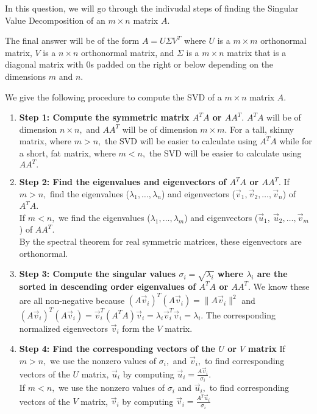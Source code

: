 

In this question, we will go through the indivudal steps of finding the Singular Value Decomposition of an $m \times n$ matrix $A.$

The final answer will be of the form $A = U \Sigma V^{T}$ where $U$ is a $m \times m$ orthonormal matrix, $V$ is a $n \times n$ orthonormal matrix, and $\Sigma$ is a $m \times n$ matrix that is a diagonal matrix with $0$s padded on the right or below depending on the dimensions $m$ and $n.$

We give the following procedure to compute the SVD of a $m \times n$ matrix $A.$

\begin{enumerate}[label=(\roman*)]
  \item \textbf{Step 1: Compute the symmetric matrix $A^{T} A$ or $A A^{T}.$} \vskip 1pt
  $A^{T}A$ will be of dimension $n \times n,$ and $AA^{T}$ will be of dimension $m \times m.$ \vskip 1pt
  For a tall, skinny matrix, where $m > n,$ the SVD will be easier to calculate using $A^{T}A$ while for a short, fat matrix, where $m < n,$ the SVD will be easier to calculate using $AA^{T}.$ 

  \item \textbf{Step 2: Find the eigenvalues and eigenvectors of $A^{T} A$ or $AA^{T}.$} \vskip 1pt
  If $m > n,$ find the eigenvalues ($\lambda_1, \ldots, \lambda_{n}$) and eigenvectors ($\vec{v}_1, \vec{v}_2, \ldots, \vec{v}_{n}$) of $A^TA$. \\
   If $m < n,$ we find the eigenvalues ($\lambda_1, \ldots, \lambda_{m}$) and eigenvectors ($\vec{u}_{1}, \ \vec{u}_{2}, \ldots, \vec{v}_{m}$) of $AA^{T}.$ \\
   By the spectral theorem for real symmetric matrices, these eigenvectors are orthonormal.

  \item \textbf{Step 3: Compute the singular values $\sigma_i = \sqrt{\lambda_i}$ where $\lambda_i$ are the sorted in descending order eigenvalues of $A^TA$ or $AA^{T}.$} \vskip 1pt 
  We know these are all non-negative because $(A\vec{v}_i)^T(A\vec{v}_i) = \|A \vec{v}_i\|^2$ and $(A\vec{v}_i)^T(A\vec{v}_i) =\vec{v}_i^T(A^T A)\vec{v}_i = \lambda_i \vec{v}_i^T\vec{v}_i = \lambda_i$. The corresponding normalized eigenvectors $\vec{v}_i$ form the $V$ matrix. 

  \item \textbf{Step 4: Find the corresponding vectors of the $U$ or $V$ matrix}  \vskip 1pt
  If $m > n,$ we use the nonzero values of $\sigma_i,$ and $\vec{v}_i,$ to find corresponding vectors of the $U$ matrix, $\vec{u}_i$ by computing $\vec{u}_i = \frac{A\vec{v}_i}{\sigma_i}$. \\
  If $m < n,$ we use the nonzero values of $\sigma_i$ and $\vec{u}_i,$ to find corresponding vectors of the $V$ matrix, $\vec{v}_i$ by computing $\vec{v}_i = \frac{A^{T} \vec{u}_i}{\sigma_i}$


\end{enumerate}
